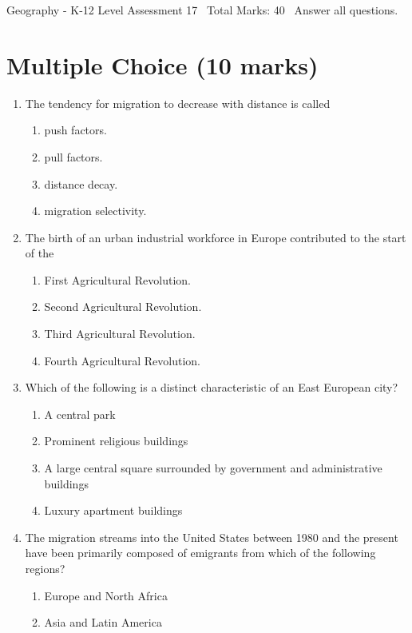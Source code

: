 \documentclass[12pt]{article}
\begin{document}
\begin{center}
Geography - K-12 Level Assessment 17 \
Total Marks: 40 \
Answer all questions.
\end{center}

\section*{Multiple Choice (10 marks)}
\begin{enumerate}[label=\arabic*.]
\item The tendency for migration to decrease with distance is called
\begin{enumerate}[label=(\alph*)]
    \item push factors.
    \item pull factors.
    \item distance decay.
    \item migration selectivity.
\end{enumerate}
\item The birth of an urban industrial workforce in Europe contributed to the start of the
\begin{enumerate}[label=(\alph*)]
    \item First Agricultural Revolution.
    \item Second Agricultural Revolution.
    \item Third Agricultural Revolution.
    \item Fourth Agricultural Revolution.
\end{enumerate}
\item Which of the following is a distinct characteristic of an East European city?
\begin{enumerate}[label=(\alph*)]
    \item A central park
    \item Prominent religious buildings
    \item A large central square surrounded by government and administrative buildings
    \item Luxury apartment buildings
\end{enumerate}
\item The migration streams into the United States between 1980 and the present have been primarily composed of emigrants from which of the following regions?
\begin{enumerate}[label=(\alph*)]
    \item Europe and North Africa
    \item Asia and Latin America

\end{enumerate}
\end{enumerate}
\end{document}
